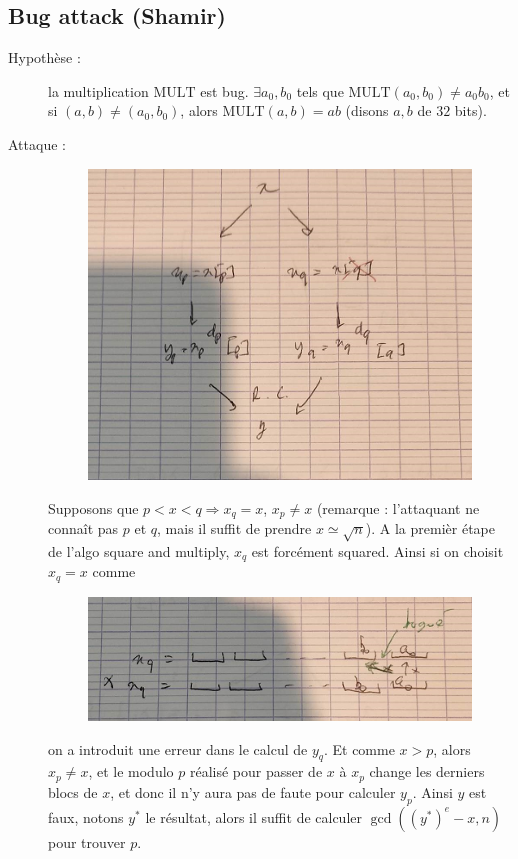         \subsection{Bug attack (Shamir)}
            \begin{description}
                \item[Hypothèse :] la multiplication $\mathrm{MULT}$ est bug. $\exists a_0, b_0$ tels que $\mathrm{MULT}(a_0, b_0) \neq a_0 b_0$, et si $(a, b) \neq (a_0, b_0)$, alors $\mathrm{MULT}(a, b) = ab$ (disons $a, b$ de $32$ bits).
                \item[Attaque : ] 
                \begin{figure}[H]
                    \centering
                    \includegraphics[width=.5\textwidth]{pictures/11}
                \end{figure} \noindent Supposons que $p < x < q \Rightarrow x_q = x$, $x_p \neq x$ (remarque : l'attaquant ne connaît pas $p$ et $q$, mais il suffit de prendre $x \simeq \sqrt{n}$). A la premièr étape de l'algo square and multiply, $x_q$ est forcément squared. Ainsi si on choisit $x_q = x$ comme
                \begin{figure}[H]
                    \centering
                    \includegraphics[width=.5\textwidth]{pictures/12}
                \end{figure} \noindent
                on a introduit une erreur dans le calcul de $y_q$. Et comme $x > p$, alors $x_p \neq x$, et le modulo $p$ réalisé pour passer de $x$ à $x_p$ change les derniers blocs de $x$, et donc il n'y aura pas de faute pour calculer $y_p$. Ainsi $y$ est faux, notons $y^*$ le résultat, alors il suffit de calculer $\gcd ((y^*)^e - x, n)$ pour trouver $p$. 
            \end{description}

